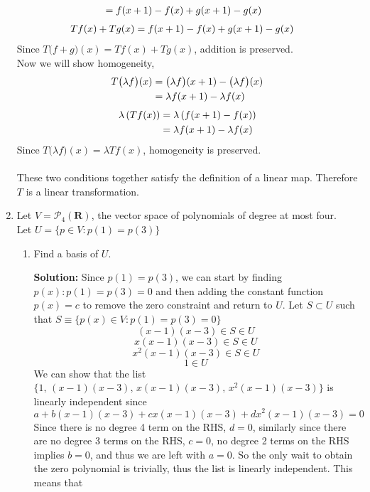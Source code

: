 \documentclass[12pt]{article}
\newcommand{\pars}[1]{\left( {#1} \right) }
\newcommand{\T}[2]{T\big({#1}\big)({#2})}
\newcommand{\func}[2]{\big({#1}\big)({#2})}
\begin{document}
\begin{enumerate}
\begin{mybox}
\begin{align}
        &= f(x+1) - f(x) + g(x+1) - g(x) \notag
    \end{align}
    \begin{align}
        {Tf(x)} + {Tg(x)} &= {f(x+1) - f(x)} + {g(x+1) - g(x)} \notag
    \end{align}
    Since $\T{f+g}{x} = {Tf(x)} + {Tg(x)}$, addition is preserved.\vspace{0.5in}\\
    Now we will show homogeneity,
    \begin{align}
        \T{\lambda f}{x} &= \func{\lambda f}{x+1} - \func{\lambda f}{x} \notag\\
        &= \lambda f(x+1) - \lambda f(x) \notag
    \end{align}
        \begin{align}
        \lambda \pars{ Tf(x)} &= \lambda \pars{ f(x+1) - f(x) } \notag \\
        &= \lambda f(x+1) - \lambda f(x) \notag
    \end{align}
    Since $\T{\lambda f}{x} = \lambda Tf(x)$, homogeneity is preserved.
    \\\\
    These two conditions together satisfy the definition of a linear map. Therefore $T$ is a linear transformation.
\end{mybox}
\newpage
\item Let $V = \mathcal{P}_4(\mathbf{R})$, the vector space of polynomials of degree at most four. \\ Let $U = \{p \in V : p(1)=p(3)\}$
    \begin{enumerate}
        \item Find a basis of $U$.
        \begin{mybox}
            \textbf{Solution: } Since $p(1)=p(3)$, we can start by finding $p(x) : p(1)=p(3)=0$ and then adding the constant function $p(x) = c$ to remove the zero constraint and return to $U$. Let $S \subset U$ such that $S \equiv \{p(x) \in V : p(1) = p(3) = 0\}$
            $$(x-1)(x-3) \in  S \in U$$
            $$x(x-1)(x-3) \in  S \in U$$
            $$x^2(x-1)(x-3) \in S\in U$$
            $$1 \in U$$
            We can show that the list $\{1,\, (x-1)(x-3),\, x(x-1)(x-3),\, x^2(x-1)(x-3)\}$ is linearly independent since
            $$a + b(x-1)(x-3) + cx(x-1)(x-3) + dx^2(x-1)(x-3) = 0$$
            Since there is no degree 4 term on the RHS, $d=0$, similarly since there are no degree 3 terms on the RHS, $c = 0$, no degree 2 terms on the RHS implies $b = 0$, and thus we are left with $a = 0$. So the only wait to obtain the zero polynomial is trivially, thus the list is linearly independent. This means that

\end{mybox}
\end{enumerate}
\end{enumerate}
\end{document}
